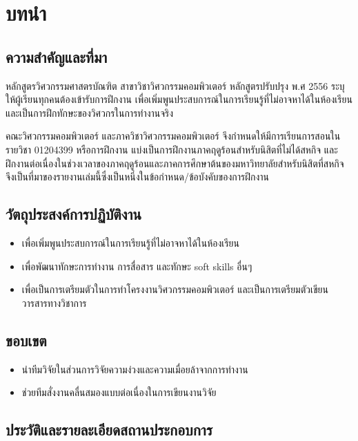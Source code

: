 \documentclass[16pt,a4]{internshipreport}
\begin{document}
\chapter{บทนำ}

\section{ความสำคัญและที่มา}
หลักสูตรวิศวกรรมศาสตรบัณฑิต สาขาวิชาวิศวกรรมคอมพิวเตอร์ หลักสูตรปรับปรุง พ.ศ 2556 ระบุให้ผู้เรียนทุกคนต้องเข้ารับการฝึกงาน เพื่อเพิ่มพูนประสบการณ์ในการเรียนรู้ที่ไม่อาจหาได้ในห้องเรียน และเป็นการฝึกทักษะของวิศวกรในการทำงานจริง

คณะวิศวกรรมคอมพิวเตอร์ และภาควิชาวิศวกรรมคอมพิวเตอร์ จึงกำหนดให้มีการเรียนการสอนในรายวิชา 01204399 หรือการฝึกงาน แบ่งเป็นการฝึกงานภาคฤดูร้อนสำหรับนิสิตที่ไม่ได้สหกิจ และฝึกงานต่อเนื่องในช่วงเวลาของภาคฤดูร้อนและภาคการศึกษาต้นของมหาวิทยาลัยสำหรับนิสิตที่สหกิจ จึงเป็นที่มาของรายงานเล่มนี้ซึ่งเป็นหนึ่งในข้อกำหนด/ข้อบังคับของการฝึกงาน

\section{วัตถุประสงค์การปฏิบัติงาน}
\begin{itemize}
    \item เพื่อเพิ่มพูนประสบการณ์ในการเรียนรู้ที่ไม่อาจหาได้ในห้องเรียน
    \item เพื่อพัฒนาทักษะการทำงาน การสื่อสาร และทักษะ soft skills อื่นๆ
    \item เพื่อเป็นการเตรียมตัวในการทำโครงงานวิศวกรรมคอมพิวเตอร์ และเป็นการเตรียมตัวเขียนวารสารทางวิชาการ
\end{itemize}

\section{ขอบเขต}
\begin{itemize}
    \item นำทีมวิจัยในส่วนการวิจัยความง่วงและความเมื่อยล้าจากการทำงาน
    \item ช่วยทีมสั่งงานคลื่นสมองแบบต่อเนื่องในการเขียนงานวิจัย
\end{itemize}

\section{ประวัติและรายละเอียดสถานประกอบการ}
\end{document}
